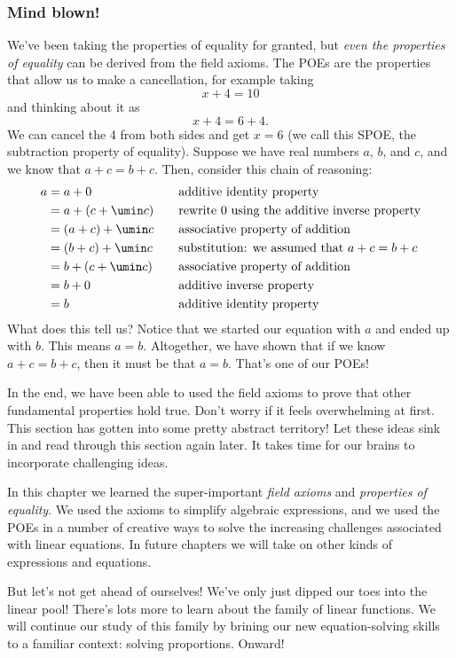 \subsubsection{Mind blown!}
We've been taking the properties of equality for granted, but \textit{even the properties of equality} can be derived from the field axioms. The POEs are the properties that allow us to make a cancellation, for example taking \[x + 4 = 10\] and thinking about it as \[x + 4 = 6 + 4.\] We can cancel the 4 from both sides and get $x = 6$ (we call this SPOE, the subtraction property of equality). Suppose we have real numbers $a$, $b$, and $c$, and we know that $a+c = b+c$. Then, consider this chain of reasoning:
\[\begin{aligned}
a &= a + 0
&& \quad\text{additive identity property}
\\
&= a + (c + \umin c)
&& \quad\text{rewrite 0 using the additive inverse property}
\\
&= (a + c) + \umin c
&& \quad\text{associative property of addition}
\\
&= (b + c) + \umin c
&& \quad\text{substitution: we assumed that $a+c = b+c$}
\\
&= b + (c + \umin c)
&& \quad\text{associative property of addition}
\\
&= b + 0
&& \quad\text{additive inverse property}
\\
&= b
&& \quad\text{additive identity property}
\end{aligned}\]
What does this tell us? Notice that we started our equation with $a$ and ended up with $b$. This means $a=b$. Altogether, we have shown that if we know $a+c = b+c$, then it must be that $a = b$. That's one of our POEs!

In the end, we have been able to used the field axioms to prove that other fundamental properties hold true. Don't worry if it feels overwhelming at first. This section has gotten into some pretty abstract territory! Let these ideas sink in and read through this section again later. It takes time for our brains to incorporate challenging ideas.

\chaptersummary

In this chapter we learned the super-important \textit{field axioms} and \textit{properties of equality}. We used the axioms to simplify algebraic expressions, and we used the POEs in a number of creative ways to solve the increasing challenges associated with linear equations. In future chapters we will take on other kinds of expressions and equations.

But let's not get ahead of ourselves! We've only just dipped our toes into the linear pool! There's lots more to learn about the family of linear functions. We will continue our study of this family by brining our new equation-solving skills to a familiar context: solving proportions. Onward!
